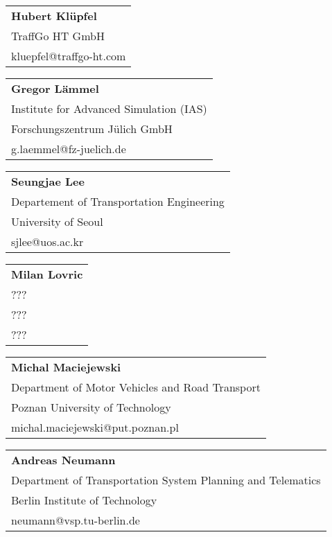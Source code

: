 \begin{tabular}[width=0.48\textwidth]{l}
\textbf{Hubert Kl\"upfel} \\
TraffGo HT GmbH\\
kluepfel@traffgo-ht.com \\
\end{tabular}

\begin{tabular}[width=0.48\textwidth]{l}
\textbf{Gregor Lämmel} \\
Institute for Advanced Simulation (IAS) \\
Forschungszentrum Jülich GmbH \\
g.laemmel@fz-juelich.de \\
\end{tabular}

\begin{tabular}[width=0.48\textwidth]{l}
\textbf{Seungjae Lee} \\
Departement of Transportation Engineering \\
University of Seoul \\
sjlee@uos.ac.kr \\
\end{tabular}

\begin{tabular}[width=0.48\textwidth]{l}
\textbf{Milan Lovric} \\
??? \\
??? \\
??? \\
\end{tabular}

\begin{tabular}[width=0.48\textwidth]{l}
\textbf{Michal Maciejewski} \\
Department of Motor Vehicles and Road Transport \\
Poznan University of Technology \\
michal.maciejewski@put.poznan.pl \\
\end{tabular}

\begin{tabular}[width=0.48\textwidth]{l}
\textbf{Andreas Neumann} \\
Department of Transportation System Planning and Telematics \\
Berlin Institute of Technology \\
neumann@vsp.tu-berlin.de \\
\end{tabular}

